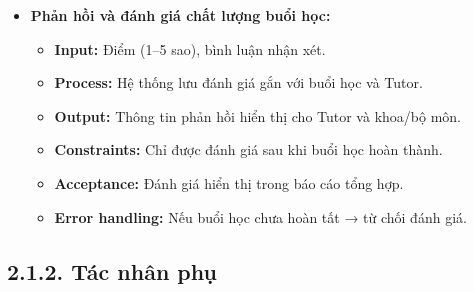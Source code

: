 \begin{itemize}
    \item \textbf{Phản hồi và đánh giá chất lượng buổi học:}
    \begin{itemize}
        \item \textbf{Input:}  Điểm (1–5 sao), bình luận nhận xét.
        \item \textbf{Process:} Hệ thống lưu đánh giá gắn với buổi học và Tutor.
        \item \textbf{Output:} Thông tin phản hồi hiển thị cho Tutor và khoa/bộ môn.
        \item \textbf{Constraints:} Chỉ được đánh giá sau khi buổi học hoàn thành.
        \item \textbf{Acceptance:} Đánh giá hiển thị trong báo cáo tổng hợp.
        \item \textbf{Error handling:} Nếu buổi học chưa hoàn tất → từ chối đánh giá.
    \end{itemize}
\end{itemize}


\subsection*{2.1.2. Tác nhân phụ}



